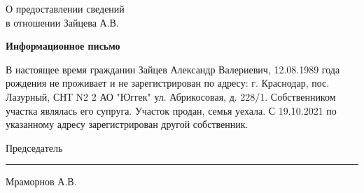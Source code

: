\begin{flushleft}
	\vspace{10mm}
О предоставлении сведений\\
в отношении Зайцева  А.В.
\end{flushleft}
\vspace{7mm}
\begin{center}
	\Large\textbf{Информационное письмо}
\end{center}
\par

В настоящее время гражданин Зайцев Александр Валериевич, 12.08.1989 года рождения не проживает и не зарегистрирован по адресу:  г. Краснодар, пос. Лазурный, СНТ N2 2 АО "Юггек" ул. Абрикосовая, д. 228/1.  Собственником участка являлась его супруга. Участок продан, семья уехала. С 19.10.2021   по указанному адресу зарегистрирован другой собственник. 

\vspace{35mm}
Председатель \hfill    \rule{4cm}{0.1 mm}    Мраморнов А.В.




